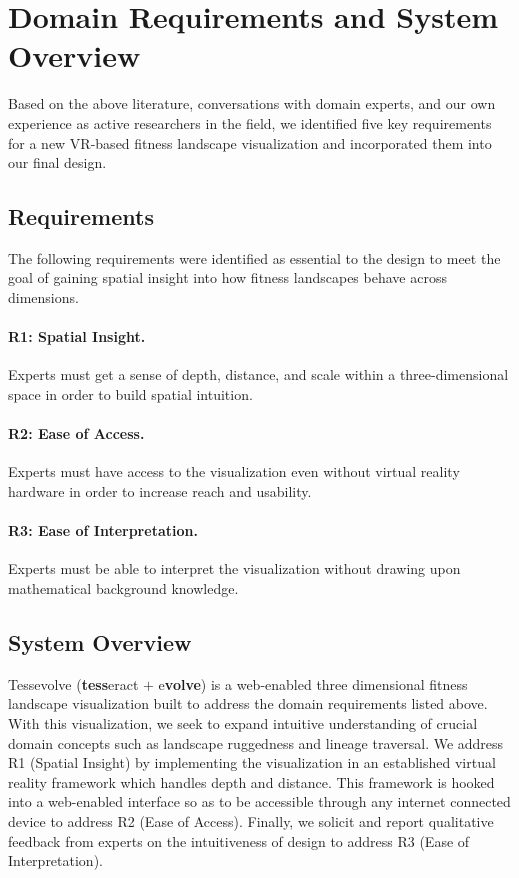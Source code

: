 \section{Domain Requirements and System Overview}

Based on the above literature, conversations with domain experts, and our own experience as active researchers in the field, we identified five key requirements for a new VR-based fitness landscape visualization and incorporated them into our final design.

\subsection{Requirements}

The following requirements were identified as essential to the design to meet the goal of gaining spatial insight into how fitness landscapes behave across dimensions.

\paragraph{\textbf{R1: Spatial Insight.}} Experts must get a sense of depth, distance, and scale within a three-dimensional space in order to build spatial intuition.

\paragraph{\textbf{R2: Ease of Access.}} Experts must have access to the visualization even without virtual reality hardware in order to increase reach and usability.

\paragraph{\textbf{R3: Ease of Interpretation.}} Experts must be able to interpret the visualization without drawing upon mathematical background knowledge.

\subsection{System Overview}

Tessevolve (\textbf{tess}eract $+$ e\textbf{volve}) is a web-enabled three dimensional fitness landscape visualization built to address the domain requirements listed above. With this visualization, we seek to expand intuitive understanding of crucial domain concepts such as landscape ruggedness and lineage traversal. We address R1 (Spatial Insight) by implementing the visualization in an established virtual reality framework which handles depth and distance. This framework is hooked into a web-enabled interface so as to be accessible through any internet connected device to address R2 (Ease of Access). Finally, we solicit and report qualitative feedback from experts on the intuitiveness of design to address R3 (Ease of Interpretation). 